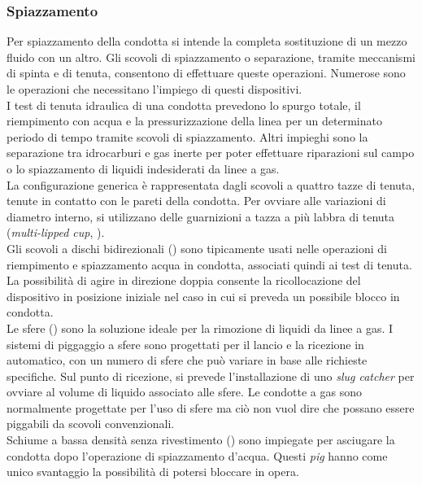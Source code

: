 \subsubsection{Spiazzamento}
Per spiazzamento della condotta si intende la completa sostituzione di un mezzo fluido con un altro. Gli scovoli di spiazzamento o separazione, tramite meccanismi di spinta e di tenuta, consentono di effettuare queste operazioni. Numerose sono le operazioni che necessitano l'impiego di questi dispositivi.\\
I test di tenuta idraulica di una condotta prevedono lo spurgo totale, il riempimento con acqua e la pressurizzazione della linea per un determinato periodo di tempo tramite scovoli di spiazzamento. Altri impieghi sono la separazione tra idrocarburi e gas inerte per poter effettuare riparazioni sul campo o lo spiazzamento di liquidi indesiderati da linee a gas.\\
La configurazione generica è rappresentata dagli scovoli a quattro tazze di tenuta, tenute in contatto con le pareti della condotta. Per ovviare alle variazioni di diametro interno, si utilizzano delle guarnizioni a tazza a più labbra di tenuta (\textit{multi-lipped cup}, ).\\
Gli scovoli a dischi bidirezionali () sono tipicamente usati nelle operazioni di riempimento e spiazzamento acqua in condotta, associati quindi ai test di tenuta. La possibilità di agire in direzione doppia consente la ricollocazione del dispositivo in posizione iniziale nel caso in cui si preveda un possibile blocco in condotta.\\
Le sfere () sono la soluzione ideale per la rimozione di liquidi da linee a gas. I sistemi di piggaggio a sfere sono progettati per il lancio e la ricezione in automatico, con un numero di sfere che può variare in base alle richieste specifiche. Sul punto di ricezione, si prevede l'installazione di uno \textit{slug catcher} per ovviare al volume di liquido associato alle sfere. Le condotte a gas sono normalmente progettate per l'uso di sfere ma ciò non vuol dire che possano essere piggabili da scovoli convenzionali.\\
Schiume a bassa densità senza rivestimento () sono impiegate per asciugare la condotta dopo l'operazione di spiazzamento d'acqua. Questi \textit{pig} hanno come unico svantaggio la possibilità di potersi bloccare in opera.\\
 
